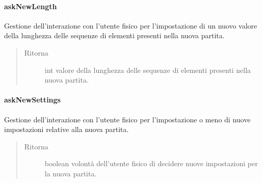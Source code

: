 \documentclass[letterpaper,10pt,italian]{sphinxmanual}
\begin{document}
\paragraph{askNewLength}
\label{\detokenize{source/it/unicam/cs/pa/mastermind/ui/StartView:asknewlength}}

\begin{fulllineitems}
\label{\detokenize{source/it/unicam/cs/pa/mastermind/ui/StartView:it.unicam.cs.pa.mastermind.ui.StartView.askNewLength()}}
Gestione dell’interazione con l’utente fisico per l’impostazione di un nuovo valore della lunghezza delle sequenze di elementi presenti nella nuova partita.
\begin{quote}\begin{description}
\item[{Ritorna}] \leavevmode
int valore della lunghezza delle sequenze di elementi presenti nella nuova partita.

\end{description}\end{quote}

\end{fulllineitems}



\paragraph{askNewSettings}
\label{\detokenize{source/it/unicam/cs/pa/mastermind/ui/StartView:asknewsettings}}

\begin{fulllineitems}
\label{\detokenize{source/it/unicam/cs/pa/mastermind/ui/StartView:it.unicam.cs.pa.mastermind.ui.StartView.askNewSettings()}}
Gestione dell’interazione con l’utente fisico per l’impostazione o meno di nuove impostazioni relative alla nuova partita.
\begin{quote}\begin{description}
\item[{Ritorna}] \leavevmode
boolean volontà dell’utente fisico di decidere nuove impostazioni per la nuova partita.

\end{description}\end{quote}

\end{fulllineitems}
\end{document}
